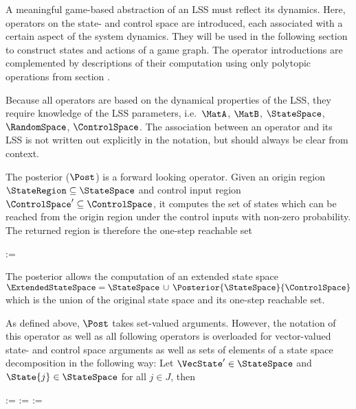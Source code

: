 A meaningful game-based abstraction of an LSS must reflect its dynamics.
Here, operators on the state- and control space are introduced, each associated with a certain aspect of the system dynamics.
They will be used in the following section to construct states and actions of a game graph.
The operator introductions are complemented by descriptions of their computation using only polytopic operations from section .

Because all operators are based on the dynamical properties of the LSS, they require knowledge of the LSS parameters, i.e.\ $\MatA$, $\MatB$, $\StateSpace$, $\RandomSpace$, $\ControlSpace$.
The association between an operator and its LSS is not written out explicitly in the notation, but should always be clear from context.


\startsubsection[title={Posterior}]

    The posterior ($\Post$) is a forward looking operator.
    Given an origin region $\StateRegion \subseteq \StateSpace$ and control input region $\ControlSpace' \subseteq \ControlSpace$, it computes the set of states which can be reached from the origin region under the control inputs with non-zero probability.
    The returned region is therefore the one-step reachable set

    \startformula
        \Posterior{\StateRegion}{\ControlRegion} :=  \EndPeriod
    \stopformula

    The posterior allows the computation of an extended state space $\ExtendedStateSpace = \StateSpace \,\cup\, \Posterior{\StateSpace}{\ControlSpace}$ which is the union of the original state space and its one-step reachable set.

    As defined above, $\Post$ takes set-valued arguments.
    However, the notation of this operator as well as all following operators is overloaded for vector-valued state- and control space arguments as well as sets of elements of a state space decomposition in the following way:
    Let $\VecState' \in \StateSpace$ and $\State{j} \in \StateSpace$ for all $j \in J$, then

    \startformula
        \startalign[n=2,align={right,left}]
            \NC {} :=
            \NC {} \EndComma
            \NR
            \NC {} :=
            \NC {} \EndAnd
            \NR
            \NC {} :=
            \NC {} \EndPeriod
            \NR
        \stopalign
    \stopformula


